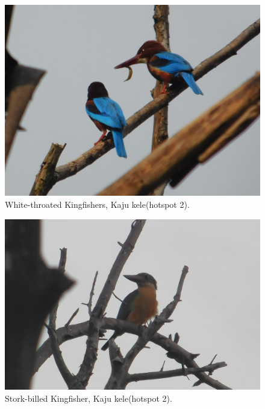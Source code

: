 \begin{figure}[!htpb]
    \centering
    \includegraphics[width=\linewidth]{Figures/kingfisher.JPG}
    \caption[]{White-throated Kingfishers, Kaju kele(hotspot 2).}
    \label{fig:figure-01}
\end{figure}
\begin{figure}[!htpb]
    \centering
    \includegraphics[width=\linewidth]{Figures/stork-billed.JPG}
    \caption[]{Stork-billed Kingfisher, Kaju kele(hotspot 2).}
    \label{fig:figure-01}
\end{figure}
